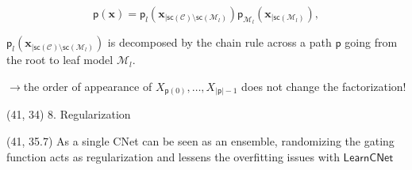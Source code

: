 \documentclass[final]{beamer}
\begin{document}
\begin{frame}{}
\begin{textblock}{17.5}
\begin{equation}
\mathsf{p}(\mathbf{x}) = \mathsf{p}_l(\mathbf x_{|\mathsf{sc}(\mathcal C)\setminus \mathsf{sc}(\mathcal M_l)})\mathsf{p}_{\mathcal M_l}(\mathbf x_{| \mathsf{sc}(\mathcal M_l)}),
\label{eq:cnetdistr}
\end{equation}

$\mathsf{p}_l(\mathbf x_{|\mathsf{sc}(\mathcal C)\setminus
  \mathsf{sc}(\mathcal M_l)})$ is decomposed by the chain rule across
a path $\mathsf{p}$ going from the root to leaf model
$\mathcal{M}_{l}$.\par
{\hfill$\rightarrow$the order of appearance of
  $X_{\mathsf{p}(0)},\dots,X_{|\mathsf{p}|-1}$ does not change the
  factorization!}

  \end{textblock}

  \begin{textblock}{17.5}(41, 34)
    8. Regularization
  \end{textblock}
  \begin{textblock}{17.5}(41, 35.7)
    \small
    As a single CNet can be seen as an ensemble,
    randomizing the gating function acts as regularization and lessens
    the overfitting issues with $\mathsf{LearnCNet}$
    

\end{textblock}
\end{frame}
\end{document}
